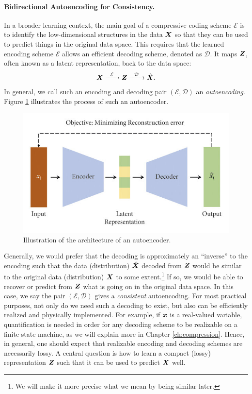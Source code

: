 \documentclass[../../book-main.tex]{subfiles}
\begin{document}
\paragraph{Bidirectional Autoencoding for Consistency.}
In a broader learning context, the main goal of a compressive coding scheme $\mathcal{E}$ is to identify the low-dimensional structures in the data $\bm{X}$ so that they can be used to predict things in the original data space. This requires that the learned encoding scheme $\mathcal{E}$ allows an efficient decoding scheme, denoted as $\mathcal D$. It maps $\bm{Z}$, often known as a latent representation, back to the data space:
\begin{equation}
    \bm{X}   \xrightarrow{\hspace{2mm} \mathcal{E}\hspace{2mm}} \bm{Z}  \xrightarrow{\hspace{2mm} \mathcal{D} \hspace{2mm}} \hat {\bm{X}}.
       \label{eqn:auto-encoding}
\end{equation}
In general, we call such an encoding and decoding pair $(\mathcal{E}, \mathcal{D})$  an {\em autoencoding}. Figure \ref{fig:autoencoder}
illustrates the process of such an autoencoder. 
\begin{figure}
    \centering
    \includegraphics[width=0.7\linewidth]{figures/Autoencoder.jpg}
    \caption{Illustration of the architecture of an autoencoder. }
    \label{fig:autoencoder}
\end{figure}


Generally, we would prefer that the decoding is approximately an ``inverse'' to the encoding such that the data (distribution) $\hat {\bm{X}}$ decoded from $\bm{Z}$ would be similar to the original data (distribution) $\bm{X}$ to some extent.\footnote{We will make it more precise what we mean by being similar later.} If so, we would be able to recover or predict from $\bm{Z}$ what is going on in the original data space. In this case, we say the pair $(\mathcal{E}, \mathcal{D})$ gives a {\em consistent}  autoencoding. For most practical purposes, not only do we need such a decoding to exist, but also can be efficiently realized and physically implemented. For example, if $\bm{x}$ is a real-valued variable, quantification is needed in order for any decoding scheme to be realizable on a finite-state machine, as we will explain more in Chapter \ref{ch:compression}. Hence, in general, one should expect that realizable encoding and decoding schemes are necessarily lossy. A central question is how to learn a compact (lossy) representation $\bm{Z}$ such that it can be used to predict $\bm{X}$ well.
\end{document}
